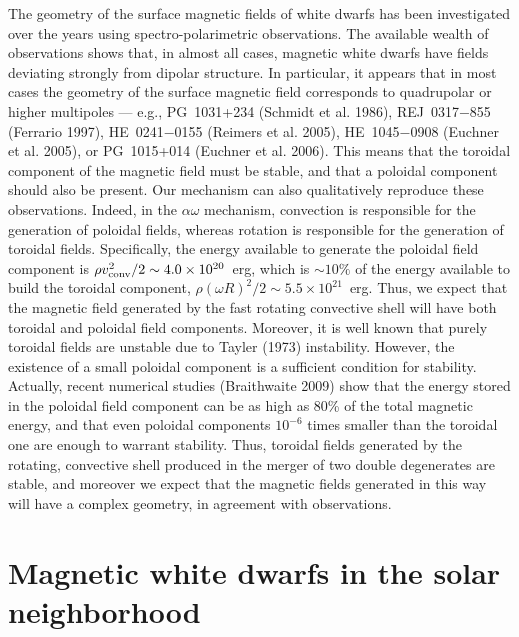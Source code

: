 \documentclass[]{emulateapj}
\begin{document}
The geometry of  the surface magnetic fields of  white dwarfs has been
investigated over  the years using  spectro-polarimetric observations.
The available wealth of observations  shows that, in almost all cases,
magnetic  white dwarfs  have  fields deviating  strongly from  dipolar
structure.  In particular, it appears  that in most cases the geometry
of  the surface magnetic  field corresponds  to quadrupolar  or higher
multipoles   ---   e.g.,   PG~1031+234   (Schmidt   et   al.    1986),
REJ~0317$-$855 (Ferrario 1997), HE~0241$-$0155 (Reimers et al.  2005),
HE~1045$-$0908 (Euchner et al.   2005), or PG~1015+014 (Euchner et al.
2006).  This means  that the toroidal component of  the magnetic field
must be stable, and that  a poloidal component should also be present.
Our  mechanism can  also qualitatively  reproduce  these observations.
Indeed, in the $\alpha\omega$ mechanism, convection is responsible for
the generation of poloidal fields, whereas rotation is responsible for
the generation of toroidal  fields. Specifically, the energy available
to generate the poloidal field component is $\rho v_{\rm conv}^2/2\sim
4.0\times 10^{20}$~erg,  which is $\sim 10\%$ of  the energy available
to  build the  toroidal component,  $\rho(\omega  R)^2/2\sim 5.5\times
10^{21}$~erg.  Thus,  we expect that  the magnetic field  generated by
the  fast  rotating  convective  shell  will have  both  toroidal  and
poloidal  field components.  Moreover,  it is  well known  that purely
toroidal    fields    are    unstable    due    to    Tayler    (1973)
instability. However, the existence of a small poloidal component is a
sufficient  condition  for   stability.   Actually,  recent  numerical
studies (Braithwaite 2009) show that the energy stored in the poloidal
field component can  be as high as 80\% of  the total magnetic energy,
and  that even poloidal  components $10^{-6}$  times smaller  than the
toroidal one  are enough to warrant stability.   Thus, toroidal fields
generated by the rotating, convective  shell produced in the merger of
two double  degenerates are  stable, and moreover  we expect  that the
magnetic fields generated in this way will have a complex geometry, in
agreement with observations.


\section{Magnetic white dwarfs in the solar neighborhood}
\label{MC}
\end{document}
